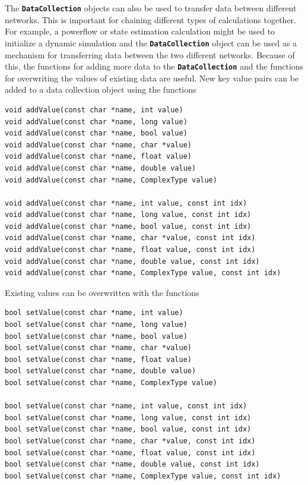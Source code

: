 The \texttt{\textbf{DataCollection}} objects can also be used to transfer data between different networks. This is important for chaining different types of calculations together. For example, a powerflow or state estimation calculation might be used to initialize a dynamic simulation and the \texttt{\textbf{DataCollection}} object can be used as a mechanism for transferring data between the two different networks. Because of this, the functions for adding more data to the \texttt{\textbf{DataCollection}} and the functions for overwriting the values of existing data are useful. New key value pairs can be added to a data collection object using the functions

{
\color{red}
\begin{Verbatim}[fontseries=b]
void addValue(const char *name, int value)
void addValue(const char *name, long value)
void addValue(const char *name, bool value)
void addValue(const char *name, char *value)
void addValue(const char *name, float value)
void addValue(const char *name, double value)
void addValue(const char *name, ComplexType value)

void addValue(const char *name, int value, const int idx)
void addValue(const char *name, long value, const int idx)
void addValue(const char *name, bool value, const int idx)
void addValue(const char *name, char *value, const int idx)
void addValue(const char *name, float value, const int idx)
void addValue(const char *name, double value, const int idx)
void addValue(const char *name, ComplexType value, const int idx)
\end{Verbatim}
}

Existing values can be overwritten with the functions

{
\color{red}
\begin{Verbatim}[fontseries=b]
bool setValue(const char *name, int value)
bool setValue(const char *name, long value)
bool setValue(const char *name, bool value)
bool setValue(const char *name, char *value)
bool setValue(const char *name, float value)
bool setValue(const char *name, double value)
bool setValue(const char *name, ComplexType value)

bool setValue(const char *name, int value, const int idx)
bool setValue(const char *name, long value, const int idx)
bool setValue(const char *name, bool value, const int idx)
bool setValue(const char *name, char *value, const int idx)
bool setValue(const char *name, float value, const int idx)
bool setValue(const char *name, double value, const int idx)
bool setValue(const char *name, ComplexType value, const int idx)
\end{Verbatim}
}
\hyperlink{topDoc}{\color{blue}{Top}}

